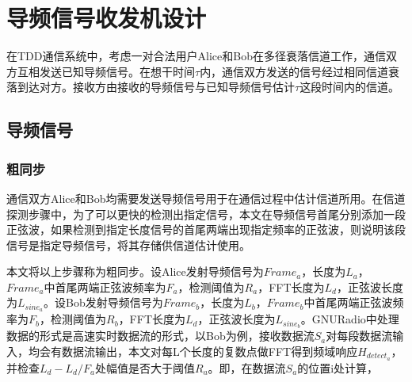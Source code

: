 % 




\chapter{导频信号收发机设计}

在TDD通信系统中，考虑一对合法用户Alice和Bob在多径衰落信道工作，通信双方互相发送已知导频信号。在想干时间$\tau$内，通信双方发送的信号经过相同信道衰落到达对方。接收方由接收的导频信号与已知导频信号估计$\tau$这段时间内的信道。


\section{导频信号}

\subsection{粗同步}
通信双方Alice和Bob均需要发送导频信号用于在通信过程中估计信道所用。在信道探测步骤中，为了可以更快的检测出指定信号，本文在导频信号首尾分别添加一段正弦波，如果检测到指定长度信号的首尾两端出现指定频率的正弦波，则说明该段信号是指定导频信号，将其存储供信道估计使用。

本文将以上步骤称为粗同步。设Alice发射导频信号为$Frame_a$，长度为$L_a$，$Frame_a$中首尾两端正弦波频率为$F_a$，检测阈值为$R_a$，FFT长度为$L_d$，正弦波长度为$L_{sine_a}$。设Bob发射导频信号为$Frame_b$，长度为$L_b$，$Frame_b$中首尾两端正弦波频率为$F_b$，检测阈值为$R_b$，FFT长度为$L_d$，正弦波长度为$L_{sine_b}$。GNURadio中处理数据的形式是高速实时数据流的形式，以Bob为例，接收数据流$S_a$对每段数据流输入，均会有数据流输出，本文对每L个长度的复数点做FFT得到频域响应$H_{detect_a}$，并检查$ L_d - L_d / F_a $处幅值是否大于阈值$R_a$。即，在数据流$S_a$的位置i处计算，

